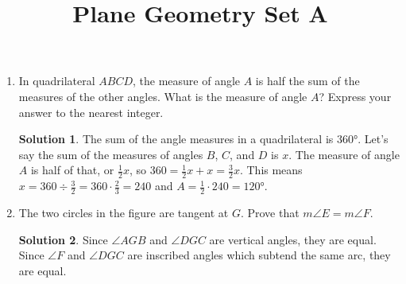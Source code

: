 \documentclass{article}
\title{Plane Geometry Set A}
\date{}
\author{}
\theoremstyle{definition}
\newtheorem*{solution}{Solution}
\begin{document}
\maketitle

\begin{multicols}{2}
    \begin{enumerate}
        \item In quadrilateral $ABCD$, the measure of angle $A$ is half the sum of the measures of the other angles.
            What is the measure of angle $A$?
            Express your answer to the nearest integer.
            \begin{solution}
                The sum of the angle measures in a quadrilateral is $\ang{360}$.
                Let's say the sum of the measures of angles $B$, $C$, and $D$ is $x$.
                The measure of angle $A$ is half of that, or $\frac{1}{2}x$, so $360 = \frac{1}{2}x + x = \frac{3}{2}x$.
                This means $x = 360 \div \frac{3}{2} = 360 \cdot \frac{2}{3} = 240$ and $A = \frac{1}{2} \cdot 240 = \ang{120}$.
            \end{solution}
        \item The two circles in the figure are tangent at $G$.
            Prove that $m\angle E = m\angle F$.
            \begin{center}
            \end{center}
            \begin{solution}
                Since $\angle AGB$ and $\angle DGC$ are vertical angles, they are equal.
                Since $\angle F$ and $\angle DGC$ are inscribed angles which subtend the same arc, they are equal.

\end{solution}
\end{enumerate}
\end{multicols}
\end{document}
